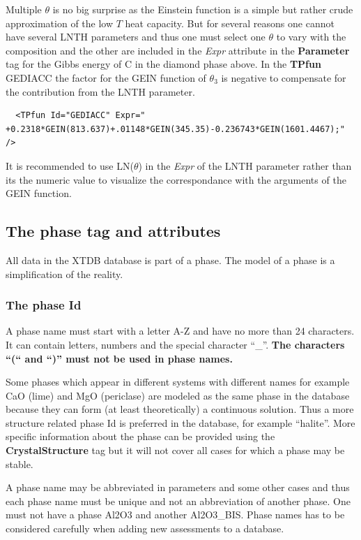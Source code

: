 \documentclass{article}
\begin{document}
Multiple $\theta$ is no big surprise as the Einstein function is a
simple but rather crude approximation of the low $T$ heat capacity.
But for several reasons one cannot have several LNTH parameters and
thus one must select one $\theta$ to vary with the composition and the
other are included in the {\em Expr} attribute in the {\bf Parameter}
tag for the Gibbs energy of C in the diamond phase above.  In the {\bf
  TPfun} GEDIACC the factor for the GEIN function of $\theta_3$ is
negative to compensate for the contribution from the LNTH parameter.

\begin{verbatim}
  <TPfun Id="GEDIACC" Expr=" +0.2318*GEIN(813.637)+.01148*GEIN(345.35)-0.236743*GEIN(1601.4467);" /> 
\end{verbatim}

It is recommended to use LN($\theta$) in the {\em Expr} of the LNTH
parameter rather than its the numeric value to visualize the
correspondance with the arguments of the GEIN function.

\subsection{The phase tag and attributes}\label{sec:phasetag}

All data in the XTDB database is part of a phase.  The model of a
phase is a simplification of the reality.

\subsubsection{The phase Id}\label{sec:phaseid}

A phase name must start with a letter A-Z and have no more than 24
characters.  It can contain letters, numbers and the special character
``\_''.  {\bf The characters ``(`` and ``)'' must not be used in phase
  names.}   

Some phases which appear in different systems with different names for
example CaO (lime) and MgO (periclase) are modeled as the same phase
in the database because they can form (at least theoretically) a
continuous solution.  Thus a more structure related phase {\rm Id} is
preferred in the database, for example ``halite''.  More specific
information about the phase can be provided using the {\bf
  CrystalStructure} tag but it will not cover all cases for which a
phase may be stable.

A phase name may be abbreviated in parameters and some other cases and
thus each phase name must be unique and not an abbreviation of another
phase.  One must not have a phase Al2O3 and another Al2O3\_BIS.  Phase
names has to be considered carefully when adding new assessments to a
database.
\end{document}
